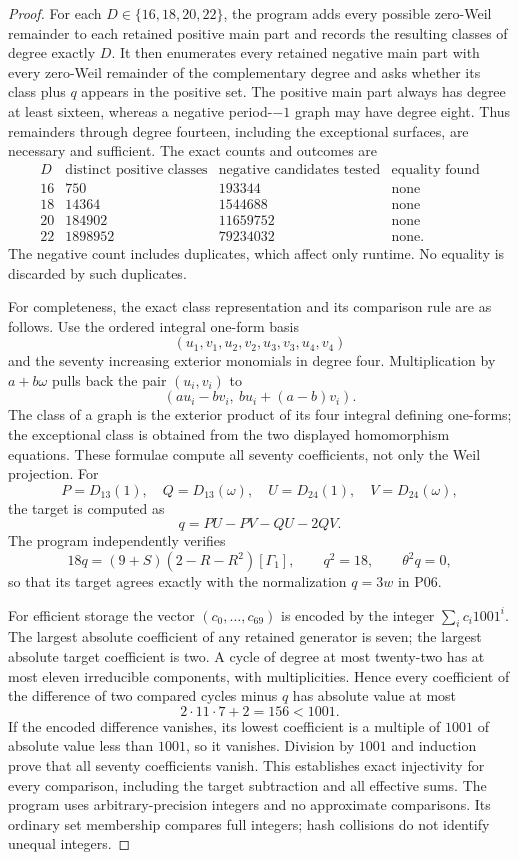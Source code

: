 \begin{proof}
For each $D\in\{16,18,20,22\}$, the program adds every possible zero-Weil remainder to each retained positive main part and records the resulting classes of degree exactly $D$. It then enumerates every retained negative main part with every zero-Weil remainder of the complementary degree and asks whether its class plus $q$ appears in the positive set. The positive main part always has degree at least sixteen, whereas a negative period-$-1$ graph may have degree eight. Thus remainders through degree fourteen, including the exceptional surfaces, are necessary and sufficient. The exact counts and outcomes are
\[
\begin{array}{c|r|r|c}
D&\text{distinct positive classes}&\text{negative candidates tested}&\text{equality found}\\\hline
16&750&193344&\text{none}\\
18&14364&1544688&\text{none}\\
20&184902&11659752&\text{none}\\
22&1898952&79234032&\text{none}.
\end{array}
\]
The negative count includes duplicates, which affect only runtime. No equality is discarded by such duplicates.

For completeness, the exact class representation and its comparison rule are as follows. Use the ordered integral one-form basis
\[
(u_1,v_1,u_2,v_2,u_3,v_3,u_4,v_4)
\]
and the seventy increasing exterior monomials in degree four. Multiplication by $a+b\omega$ pulls back the pair $(u_i,v_i)$ to
\[
(a u_i-b v_i,\ b u_i+(a-b)v_i).
\]
The class of a graph is the exterior product of its four integral defining one-forms; the exceptional class is obtained from the two displayed homomorphism equations. These formulae compute all seventy coefficients, not only the Weil projection. For
\[
P=D_{13}(1),\quad Q=D_{13}(\omega),\quad
U=D_{24}(1),\quad V=D_{24}(\omega),
\]
the target is computed as
\[
q=PU-PV-QU-2QV.
\]
The program independently verifies
\[
18q=(9+S)(2-R-R^2)[\Gamma_1],\qquad q^2=18,
\qquad\theta^2q=0,
\]
so that its target agrees exactly with the normalization $q=3w$ in P06.

For efficient storage the vector $(c_0,\ldots,c_{69})$ is encoded by the integer $\sum_i c_i1001^i$. The largest absolute coefficient of any retained generator is seven; the largest absolute target coefficient is two. A cycle of degree at most twenty-two has at most eleven irreducible components, with multiplicities. Hence every coefficient of the difference of two compared cycles minus $q$ has absolute value at most
\[
2\cdot11\cdot7+2=156<1001.
\]
If the encoded difference vanishes, its lowest coefficient is a multiple of $1001$ of absolute value less than $1001$, so it vanishes. Division by $1001$ and induction prove that all seventy coefficients vanish. This establishes exact injectivity for every comparison, including the target subtraction and all effective sums. The program uses arbitrary-precision integers and no approximate comparisons. Its ordinary set membership compares full integers; hash collisions do not identify unequal integers.


\end{proof}
